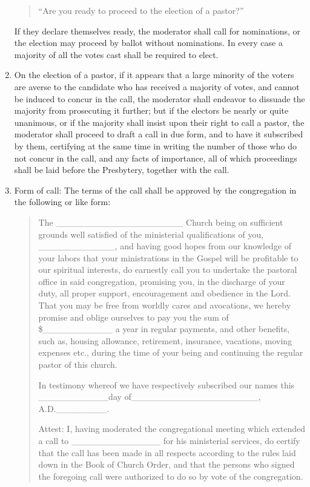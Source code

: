 \documentclass[
]{book}
\begin{document}
\begin{enumerate}
  \begin{quote}
  ``Are you ready to proceed to the election of a pastor?''
  \end{quote}

  If they declare themselves ready, the moderator shall call for nominations, or the election may proceed by ballot without nominations. In every case a majority of all the votes cast shall be required to elect.
\item
  On the election of a pastor, if it appears that a large minority of the voters are averse to the candidate who has received a majority of votes, and cannot be induced to concur in the call, the moderator shall endeavor to dissuade the majority from prosecuting it further; but if the electors be nearly or quite unanimous, or if the majority shall insist upon their right to call a pastor, the moderator shall proceed to draft a call in due form, and to have it subscribed by them, certifying at the same time in writing the number of those who do not concur in the call, and any facts of importance, all of which proceedings shall be laid before the Presbytery, together with the call.
\item
  \protect\hypertarget{22.6}{\href{}{}}Form of call: The terms of the call shall be approved by the congregation in the following or like form:

  \begin{quote}
  The \_\_\_\_\_\_\_\_\_\_\_\_\_\_\_\_\_\_\_\_ Church being on sufficient grounds well satisfied of the ministerial qualifications of you, \_\_\_\_\_\_\_\_\_\_\_\_, and having good hopes from our knowledge of your labors that your ministrations in the Gospel will be profitable to our spiritual interests, do earnestly call you to undertake the pastoral office in said congregation, promising you, in the discharge of your duty, all proper support, encouragement and obedience in the Lord. That you may be free from worldly cares and avocations, we hereby promise and oblige ourselves to pay you the sum of \$\_\_\_\_\_\_\_\_\_\_\_ a year in regular payments, and other benefits, such as, housing allowance, retirement, insurance, vacations, moving expenses etc., during the time of your being and continuing the regular pastor of this church.

  In testimony whereof we have respectively subscribed our names this \_\_\_\_\_\_\_\_\_\_\_day of\_\_\_\_\_\_\_\_\_\_\_\_\_\_\_\_\_\_\_\_, A.D.\_\_\_\_\_\_\_\_.

  Attest: I, having moderated the congregational meeting which extended a call to \_\_\_\_\_\_\_\_\_\_\_\_\_\_ for his ministerial services, do certify that the call has been made in all respects according to the rules laid down in the Book of Church Order, and that the persons who signed the foregoing call were authorized to do so by vote of the congregation.


\end{quote}
\end{enumerate}
\end{document}

